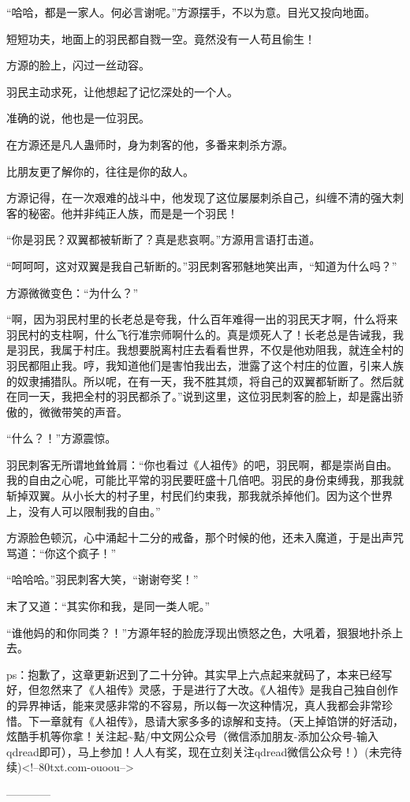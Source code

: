 \begin{this_body}
“哈哈，都是一家人。何必言谢呢。”方源摆手，不以为意。目光又投向地面。

短短功夫，地面上的羽民都自戮一空。竟然没有一人苟且偷生！

方源的脸上，闪过一丝动容。

羽民主动求死，让他想起了记忆深处的一个人。

准确的说，他也是一位羽民。

在方源还是凡人蛊师时，身为刺客的他，多番来刺杀方源。

比朋友更了解你的，往往是你的敌人。

方源记得，在一次艰难的战斗中，他发现了这位屡屡刺杀自己，纠缠不清的强大刺客的秘密。他并非纯正人族，而是是一个羽民！

“你是羽民？双翼都被斩断了？真是悲哀啊。”方源用言语打击道。

“呵呵呵，这对双翼是我自己斩断的。”羽民刺客邪魅地笑出声，“知道为什么吗？”

方源微微变色：“为什么？”

“啊，因为羽民村里的长老总是夸我，什么百年难得一出的羽民天才啊，什么将来羽民村的支柱啊，什么飞行准宗师啊什么的。真是烦死人了！长老总是告诫我，我是羽民，我属于村庄。我想要脱离村庄去看看世界，不仅是他劝阻我，就连全村的羽民都阻止我。哼，我知道他们是害怕我出去，泄露了这个村庄的位置，引来人族的奴隶捕猎队。所以呢，在有一天，我不胜其烦，将自己的双翼都斩断了。然后就在同一天，我把全村的羽民都杀了。”说到这里，这位羽民刺客的脸上，却是露出骄傲的，微微带笑的声音。

“什么？！”方源震惊。

羽民刺客无所谓地耸耸肩：“你也看过《人祖传》的吧，羽民啊，都是崇尚自由。我的自由之心呢，可能比平常的羽民要旺盛十几倍吧。羽民的身份束缚我，那我就斩掉双翼。从小长大的村子里，村民们约束我，那我就杀掉他们。因为这个世界上，没有人可以限制我的自由。”

方源脸色顿沉，心中涌起十二分的戒备，那个时候的他，还未入魔道，于是出声咒骂道：“你这个疯子！”

“哈哈哈。”羽民刺客大笑，“谢谢夸奖！”

末了又道：“其实你和我，是同一类人呢。”

“谁他妈的和你同类？！”方源年轻的脸庞浮现出愤怒之色，大吼着，狠狠地扑杀上去。

ps：抱歉了，这章更新迟到了二十分钟。其实早上六点起来就码了，本来已经写好，但忽然来了《人祖传》灵感，于是进行了大改。《人祖传》是我自己独自创作的异界神话，能来灵感非常的不容易，所以每一次这种情况，真人我都会非常珍惜。下一章就有《人祖传》，恳请大家多多的谅解和支持。（天上掉馅饼的好活动，炫酷手机等你拿！关注起\~{}點/中文网公众号（微信添加朋友-添加公众号-输入qdread即可），马上参加！人人有奖，现在立刻关注qdread微信公众号！）(未完待续)<!--80txt.com-ouoou-->

------------

\end{this_body}

